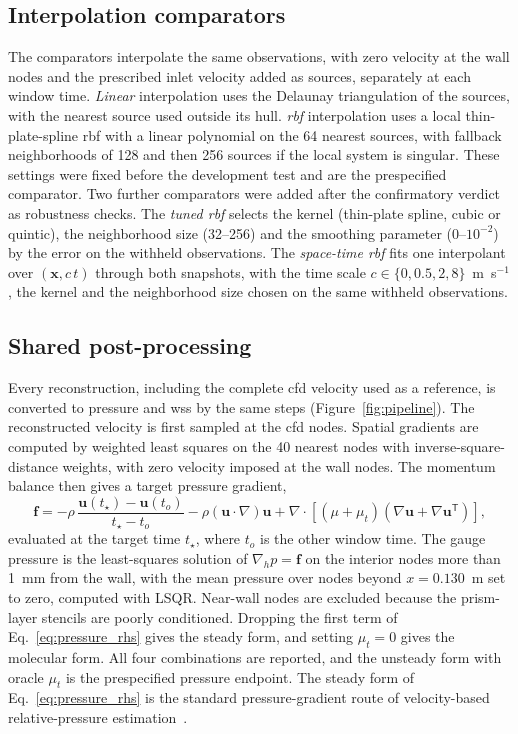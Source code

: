 \documentclass[12pt,a4paper]{article}
\newcommand{\CFD}{\ac{cfd}\xspace}
\newcommand{\WSS}{\ac{wss}\xspace}
\newcommand{\RBF}{\ac{rbf}\xspace}
\theoremstyle{definition}
\numberwithin{equation}{section}
\begin{document}
\subsection{Interpolation comparators}
\label{sec:interpolation}
The comparators interpolate the same observations, with zero velocity at the wall nodes and the prescribed inlet velocity added as sources, separately at each window time. \emph{Linear} interpolation uses the Delaunay triangulation of the sources, with the nearest source used outside its hull. \emph{\RBF} interpolation uses a local thin-plate-spline \RBF with a linear polynomial on the 64 nearest sources, with fallback neighborhoods of 128 and then 256 sources if the local system is singular. These settings were fixed before the development test and are the prespecified comparator. Two further comparators were added after the confirmatory verdict as robustness checks. The \emph{tuned \RBF} selects the kernel (thin-plate spline, cubic or quintic), the neighborhood size (32--256) and the smoothing parameter ($0$--$10^{-2}$) by the error on the withheld observations. The \emph{space-time \RBF} fits one interpolant over $(\mathbf x, c\,t)$ through both snapshots, with the time scale $c\in\{0,0.5,2,8\}$~m~s$^{-1}$, the kernel and the neighborhood size chosen on the same withheld observations.

\subsection{Shared post-processing}
\label{sec:postprocessing}
Every reconstruction, including the complete \CFD velocity used as a reference, is converted to pressure and \WSS by the same steps (Figure~\ref{fig:pipeline}). The reconstructed velocity is first sampled at the \CFD nodes. Spatial gradients are computed by weighted least squares on the 40 nearest nodes with inverse-square-distance weights, with zero velocity imposed at the wall nodes. The momentum balance then gives a target pressure gradient,
\begin{equation}
\mathbf f=-\rho\,\frac{\mathbf u(t_\star)-\mathbf u(t_o)}{t_\star-t_o}
-\rho(\mathbf u\cdot\nabla)\mathbf u
+\nabla\cdot\left[(\mu+\mu_t)(\nabla\mathbf u+\nabla\mathbf u^{\mathsf T})\right],
\label{eq:pressure_rhs}
\end{equation}
evaluated at the target time $t_\star$, where $t_o$ is the other window time. The gauge pressure is the least-squares solution of $\nabla_h p=\mathbf f$ on the interior nodes more than 1~mm from the wall, with the mean pressure over nodes beyond $x=0.130$~m set to zero, computed with LSQR. Near-wall nodes are excluded because the prism-layer stencils are poorly conditioned. Dropping the first term of Eq.~\eqref{eq:pressure_rhs} gives the steady form, and setting $\mu_t=0$ gives the molecular form. All four combinations are reported, and the unsteady form with oracle $\mu_t$ is the prespecified pressure endpoint. The steady form of Eq.~\eqref{eq:pressure_rhs} is the standard pressure-gradient route of velocity-based relative-pressure estimation~\cite{bertoglio2018relative}.
\end{document}
